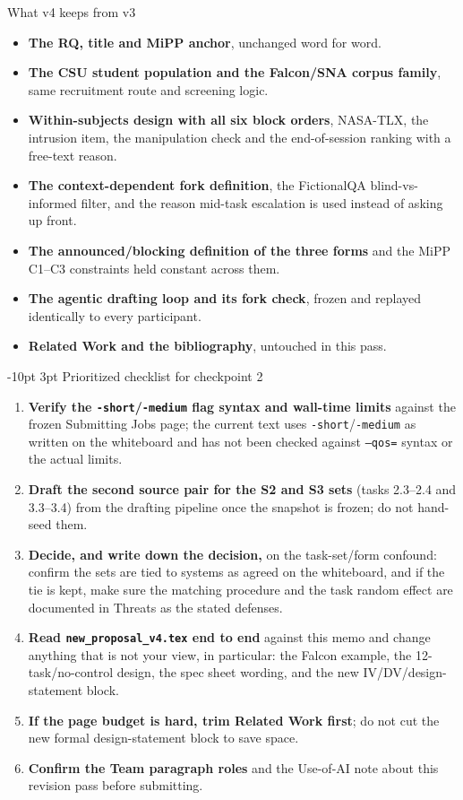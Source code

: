 \documentclass[9pt,letterpaper]{extarticle}
\makeatletter
\renewcommand\section{\@startsection{section}{1}{\z@}%
  {-10pt \@plus -2pt \@minus -1pt}{3pt}%
  {\sffamily\bfseries\large\color{accent}}}
\newcommand{\hd}[1]{\textbf{#1}}
\let\oldsection\section
\renewcommand{\section}{\needspace{7\baselineskip}\oldsection}
\makeatother
\begin{document}
\begin{keepbox}{What v4 keeps from v3}
\begin{itemize}[leftmargin=1.2em, itemsep=1pt]
  \item \hd{The RQ, title and MiPP anchor}, unchanged word for word.
  \item \hd{The CSU student population and the Falcon/SNA corpus family},
  same recruitment route and screening logic.
  \item \hd{Within-subjects design with all six block orders}, NASA-TLX,
  the intrusion item, the manipulation check and the end-of-session
  ranking with a free-text reason.
  \item \hd{The context-dependent fork definition}, the FictionalQA
  blind-vs-informed filter, and the reason mid-task escalation is used
  instead of asking up front.
  \item \hd{The announced/blocking definition of the three forms} and the
  MiPP C1--C3 constraints held constant across them.
  \item \hd{The agentic drafting loop and its fork check}, frozen and
  replayed identically to every participant.
  \item \hd{Related Work and the bibliography}, untouched in this pass.
\end{itemize}
\end{keepbox}

\section{Prioritized checklist for checkpoint 2}
\begin{enumerate}[leftmargin=1.6em, itemsep=2pt, label=\sffamily\bfseries\color{accent}\arabic*.]
  \item \hd{Verify the \texttt{-short}/\texttt{-medium} flag syntax and
  wall-time limits} against the frozen Submitting Jobs page; the current
  text uses \texttt{-short}/\texttt{-medium} as written on the whiteboard
  and has not been checked against \texttt{--qos=} syntax or the actual
  limits.
  \item \hd{Draft the second source pair for the S2 and S3 sets} (tasks
  2.3--2.4 and 3.3--3.4) from the drafting pipeline once the snapshot is
  frozen; do not hand-seed them.
  \item \hd{Decide, and write down the decision,} on the task-set/form
  confound: confirm the sets are tied to systems as agreed on the
  whiteboard, and if the tie is kept, make sure the matching procedure and
  the task random effect are documented in Threats as the stated defenses.
  \item \hd{Read \texttt{new\_proposal\_v4.tex} end to end} against this
  memo and change anything that is not your view, in particular: the
  Falcon example, the 12-task/no-control design, the spec sheet wording,
  and the new IV/DV/design-statement block.
  \item \hd{If the page budget is hard, trim Related Work first}; do not
  cut the new formal design-statement block to save space.
  \item \hd{Confirm the Team paragraph roles} and the Use-of-AI note about
  this revision pass before submitting.
\end{enumerate}
\end{document}
